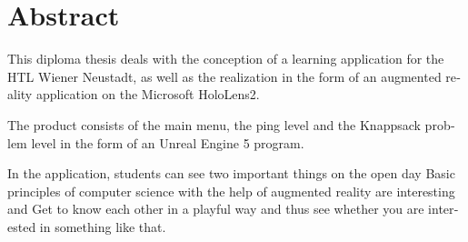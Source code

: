 \chapter{Abstract}

\begin{english} %
This diploma thesis deals with the conception of a learning application
for the HTL Wiener Neustadt, as well as the realization in the form of
an augmented reality application on the Microsoft HoloLens2.

The product consists of the main menu, the ping level and the
Knappsack problem level in the form of an Unreal Engine 5 program.

In the application, students can see two important things on the open day
Basic principles of computer science with the help of augmented reality are interesting and
Get to know each other in a playful way and thus see whether you are interested in something like that.
\end{english}


